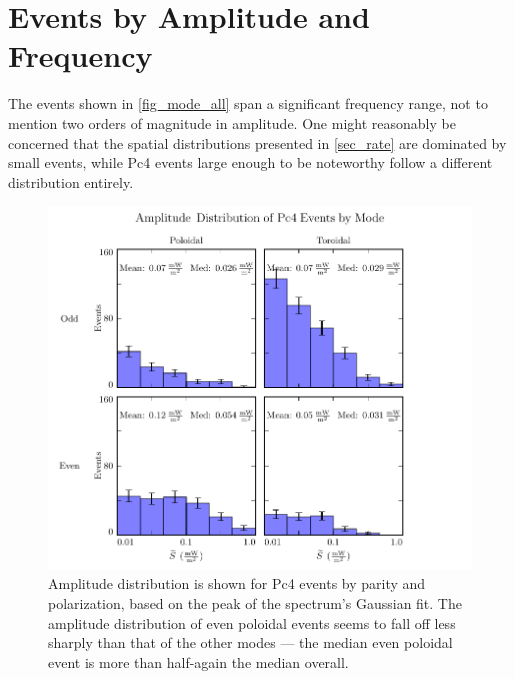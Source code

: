 \section{Events by Amplitude and Frequency}
  \label{sec_amp_f}

The events shown in \cref{fig_mode_all} span a significant frequency range, not
to mention two orders of magnitude in
amplitude. One might reasonably be concerned that the spatial distributions
presented in \cref{sec_rate} are dominated by small events, while Pc4 events
large enough to be noteworthy follow a different distribution entirely. 

\begin{figure}[!htb]
  \centering
  \includegraphics[width=\textwidth]{figures/amp.pdf}
  \caption[Amplitude Distribution of Pc4 Events by Mode]{
    Amplitude distribution is shown for Pc4 events by parity and polarization,
    based on the peak of the spectrum's Gaussian fit. The amplitude
    distribution of even poloidal events seems to fall off less sharply than
    that of the other modes --- the median even poloidal event is more than
    half-again the median overall. 
  }
  \label{fig_amp}
\end{figure}



